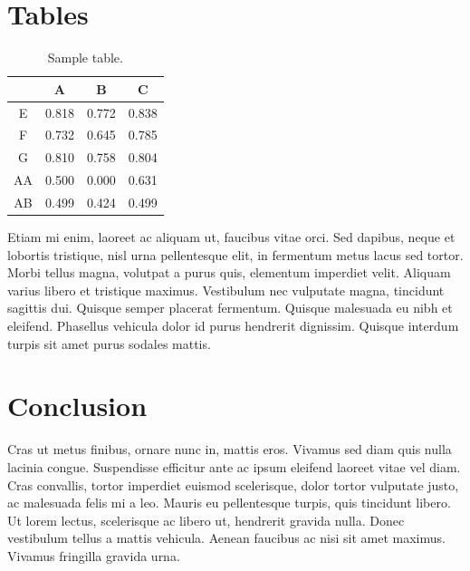 \documentclass[10pt,conference]{IEEEtran}
\begin{document}
\section{Tables}

  \begin{table}
    \centering
    \begin{tabular}{c|c c c}
      & A & B & C \\
      \hline
      \hline
      E & 0.818 & 0.772 & 0.838 \\
      F & 0.732 & 0.645 & 0.785 \\
      G & 0.810 & 0.758 & 0.804 \\
      \hline
      AA & 0.500 & 0.000 & 0.631 \\
      AB & 0.499 & 0.424 & 0.499 \\

    \end{tabular}
    \caption{Sample table.}
    \label{tableexample}
  \end{table}

  Etiam mi enim, laoreet ac aliquam ut, faucibus vitae orci. Sed dapibus, neque et lobortis tristique, nisl urna pellentesque elit, in fermentum metus lacus sed tortor. Morbi tellus magna, volutpat a purus quis, elementum imperdiet velit. Aliquam varius libero et tristique maximus. Vestibulum nec vulputate magna, tincidunt sagittis dui. Quisque semper placerat fermentum. Quisque malesuada eu nibh et eleifend. Phasellus vehicula dolor id purus hendrerit dignissim. Quisque interdum turpis sit amet purus sodales mattis.







\section{Conclusion}
  Cras ut metus finibus, ornare nunc in, mattis eros. Vivamus sed diam quis nulla lacinia congue. Suspendisse efficitur ante ac ipsum eleifend laoreet vitae vel diam. Cras convallis, tortor imperdiet euismod scelerisque, dolor tortor vulputate justo, ac malesuada felis mi a leo. Mauris eu pellentesque turpis, quis tincidunt libero. Ut lorem lectus, scelerisque ac libero ut, hendrerit gravida nulla. Donec vestibulum tellus a mattis vehicula. Aenean faucibus ac nisi sit amet maximus. Vivamus fringilla gravida urna.


\nocite{*}




\vspace{12pt}
\end{document}
